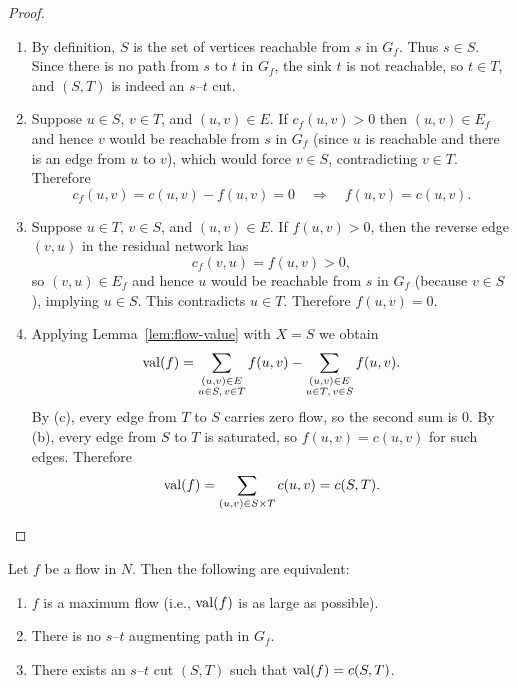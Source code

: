 \documentclass[11pt]{article}
\begin{document}
\begin{proof}
\begin{enumerate}[label=(\alph*), itemsep=0.2em]
  \item By definition, $S$ is the set of vertices reachable from $s$ in $G_f$.
        Thus $s\in S$. Since there is no path from $s$ to $t$ in $G_f$, the
        sink $t$ is not reachable, so $t\in T$, and $(S,T)$ is indeed an
        $s$--$t$ cut.
  \item Suppose $u\in S$, $v\in T$, and $(u,v)\in E$. If $c_f(u,v) > 0$ then
        $(u,v)\in E_f$ and hence $v$ would be reachable from $s$ in $G_f$
        (since $u$ is reachable and there is an edge from $u$ to $v$), which
        would force $v\in S$, contradicting $v\in T$. Therefore
        \[
          c_f(u,v) = c(u,v)-f(u,v)=0 \quad\Rightarrow\quad f(u,v)=c(u,v).
        \]
  \item Suppose $u\in T$, $v\in S$, and $(u,v)\in E$. If $f(u,v) > 0$, then
        the reverse edge $(v,u)$ in the residual network has
        \[
          c_f(v,u) = f(u,v) > 0,
        \]
        so $(v,u)\in E_f$ and hence $u$ would be reachable from $s$ in
        $G_f$ (because $v\in S$), implying $u\in S$. This contradicts $u\in T$.
        Therefore $f(u,v)=0$.
  \item Applying Lemma~\ref{lem:flow-value} with $X=S$ we obtain
        \[
          \mathrm{val}(f)
          = \sum_{\substack{(u,v)\in E\\ u\in S,\, v\in T}} f(u,v)
            - \sum_{\substack{(u,v)\in E\\ u\in T,\, v\in S}} f(u,v).
        \]
        By (c), every edge from $T$ to $S$ carries zero flow, so the second
        sum is $0$. By (b), every edge from $S$ to $T$ is saturated, so
        $f(u,v)=c(u,v)$ for such edges. Therefore
        \[
          \mathrm{val}(f) = \sum_{(u,v)\in S\times T} c(u,v) = c(S,T).
        \]
\end{enumerate}
\end{proof}

\begin{lemma}\label{lem:char-aug}
Let $f$ be a flow in $N$. Then the following are equivalent:
\begin{enumerate}[label=(\roman*), itemsep=0.2em]
  \item $f$ is a maximum flow (i.e., $\mathrm{val}(f)$ is as large as possible).
  \item There is no $s$--$t$ augmenting path in $G_f$.
  \item There exists an $s$--$t$ cut $(S,T)$ such that
  $\mathrm{val}(f) = c(S,T)$.
\end{enumerate}
\end{lemma}
\end{document}
